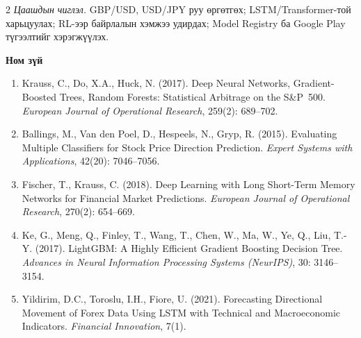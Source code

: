 \begin{multicols*}{2}
\emph{Цаашдын чиглэл.} GBP/USD, USD/JPY руу өргөтгөх; LSTM/Transformer-той харьцуулах; RL-ээр байрлалын хэмжээ удирдах; Model Registry ба Google Play түгээлтийг хэрэгжүүлэх.

\noindent\textbf{Ном зүй}

\begingroup
\scriptsize
\setlength{\parskip}{2pt}
\begin{enumerate}\setlength\itemsep{1pt}\setlength\parsep{0pt}\setlength\topsep{0pt}
    \item Krauss, C., Do, X.A., Huck, N. (2017). Deep Neural Networks, Gradient-Boosted Trees, Random Forests: Statistical Arbitrage on the S\&P~500. \emph{European Journal of Operational Research}, 259(2): 689--702.
    \item Ballings, M., Van den Poel, D., Hespeels, N., Gryp, R. (2015). Evaluating Multiple Classifiers for Stock Price Direction Prediction. \emph{Expert Systems with Applications}, 42(20): 7046--7056.
    \item Fischer, T., Krauss, C. (2018). Deep Learning with Long Short-Term Memory Networks for Financial Market Predictions. \emph{European Journal of Operational Research}, 270(2): 654--669.
    \item Ke, G., Meng, Q., Finley, T., Wang, T., Chen, W., Ma, W., Ye, Q., Liu, T.-Y. (2017). LightGBM: A Highly Efficient Gradient Boosting Decision Tree. \emph{Advances in Neural Information Processing Systems (NeurIPS)}, 30: 3146--3154.
    \item Yildirim, D.C., Toroslu, I.H., Fiore, U. (2021). Forecasting Directional Movement of Forex Data Using LSTM with Technical and Macroeconomic Indicators. \emph{Financial Innovation}, 7(1).
\end{enumerate}
\endgroup

\end{multicols*}
